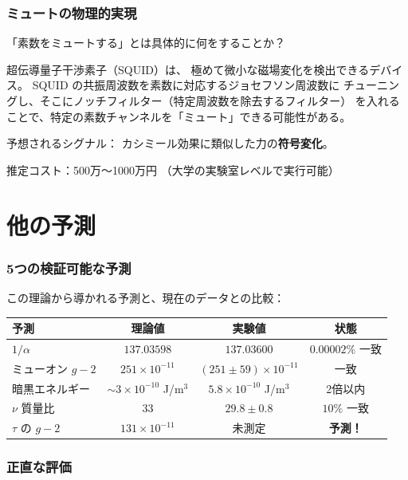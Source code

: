 \documentclass[11pt,a4paper]{article}
\begin{document}
\section{ミュートの物理的実現}

「素数をミュートする」とは具体的に何をすることか？

\begin{storybox}[SQUID 実験]
超伝導量子干渉素子（SQUID）は、
極めて微小な磁場変化を検出できるデバイス。
SQUID の共振周波数を素数に対応するジョセフソン周波数に
チューニングし、そこにノッチフィルター（特定周波数を除去するフィルター）
を入れることで、特定の素数チャンネルを「ミュート」できる可能性がある。

予想されるシグナル：
カシミール効果に類似した力の\textbf{符号変化}。

推定コスト：500万〜1000万円
（大学の実験室レベルで実行可能）
\end{storybox}

\part{他の予測}

\section{5つの検証可能な予測}

この理論から導かれる予測と、現在のデータとの比較：

\begin{center}
\renewcommand{\arraystretch}{1.4}
\begin{tabular}{l|c|c|c}
予測 & 理論値 & 実験値 & 状態 \\
\hline
$1/\alpha$ & $137.03598$ & $137.03600$ & $0.00002\%$ 一致 \\
ミューオン $g-2$ & $251 \times 10^{-11}$ & $(251 \pm 59) \times 10^{-11}$ & 一致 \\
暗黒エネルギー & $\sim 3 \times 10^{-10}$ J/m$^3$ & $5.8 \times 10^{-10}$ J/m$^3$ & 2倍以内 \\
$\nu$ 質量比 & $33$ & $29.8 \pm 0.8$ & $10\%$ 一致 \\
$\tau$ の $g-2$ & $131 \times 10^{-11}$ & 未測定 & \textbf{予測！}
\end{tabular}
\end{center}

\section{正直な評価}
\end{document}
